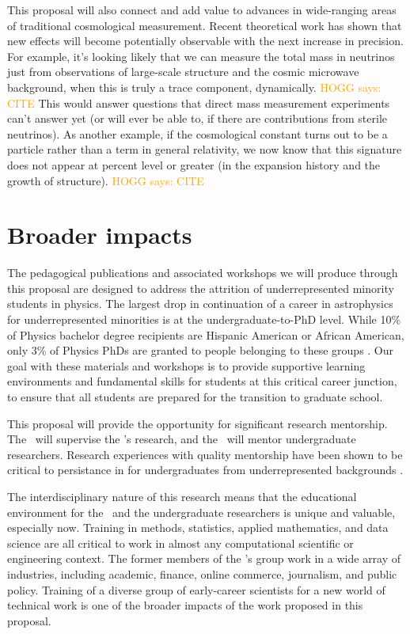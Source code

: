 \documentclass[12pt, fullpage, letterpaper]{article}
\newcommand{\HOGG}[1]{\textcolor{orange}{HOGG says: #1}}
\begin{document}
This proposal will also connect and add value to advances in wide-ranging areas of traditional cosmological measurement.
Recent theoretical work has shown that new effects will become potentially observable with the next increase in precision.
For example, it's looking likely that we can measure the total mass in
neutrinos just from observations of large-scale structure and the
cosmic microwave background, when this is truly a trace component,
dynamically. \HOGG{CITE}
This would answer questions that direct mass measurement experiments
can't answer yet (or will ever be able to, if there are contributions from sterile neutrinos).
As another example, if the cosmological constant turns out to be a particle rather
than a term in general relativity, we now know that
this signature does not appear at percent level or greater (in the
expansion history and the growth of structure). \HOGG{CITE}

\section{Broader impacts}

The pedagogical publications and associated workshops we will produce through this proposal are designed to address the attrition of underrepresented minority students in physics.
The largest drop in continuation of a career in astrophysics for underrepresented minorities is at the undergraduate-to-PhD level.
While 10\% of Physics bachelor degree recipients are Hispanic American or African American, only 3\% of Physics PhDs are granted to people belonging to these groups \citep{Ivie2018}.
Our goal with these materials and workshops is to provide supportive learning environments and fundamental skills for students at this critical career junction, to ensure that all students are prepared for the transition to graduate school.

This proposal will provide the opportunity for significant research mentorship.
The \PI\ will supervise the \GRA's research, and the \GRA\ will mentor undergraduate researchers.
Research experiences with quality mentorship have been shown to be critical to persistance in  for undergraduates from underrepresented backgrounds \citep{Estrada2018}.

The interdisciplinary nature of this research means that the educational environment for the \GRA\ and the undergraduate researchers is unique and valuable, especially now.
Training in methods, statistics, applied mathematics, and data science are all critical to work in almost any computational scientific or engineering context.
The former members of the \PI's group work in a wide array of industries, including academic, finance, online commerce, journalism, and public policy.
Training of a diverse group of early-career scientists for a new world of technical work is one of the broader impacts of the work proposed in this proposal.
\end{document}
